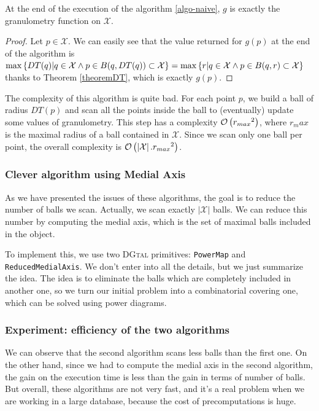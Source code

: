 \begin{theoreme}
	At the end of the execution of the algorithm \ref{algo-naive}, $g$ is exactly the granulometry function on $\mathcal{X}$.
\end{theoreme}

\begin{proof}
Let $p \in \mathcal{X}$. We can easily see that the value returned for $g(p)$ at the end of the algorithm is 
$ \operatorname{max} \left\{ DT(q) | q \in \mathcal{X} \wedge p \in B(q,DT(q)) \subset \mathcal{X} \right\} 
= \operatorname{max} \left\{ r | q \in \mathcal{X} \wedge p \in B(q,r) \subset \mathcal{X} \right\}$ thanks to Theorem \ref{theoremDT}, which is exactly $g(p)$.
\end{proof}

The complexity of this algorithm is quite bad. For each point $p$, we build a ball of radius $DT(p)$ and scan all the points inside the ball to (eventually) update some values of granulometry. This step has a complexity $\mathcal O \left( {r_{max}}^2 \right)$, where $r_max$ is the maximal radius of a ball contained in $\mathcal{X}$. Since we scan only one ball per point, the overall complexity is $\mathcal O \left( \left| \mathcal{X} \right|. {r_{max}}^2 \right)$.

\subsubsection{Clever algorithm using Medial Axis}

As we have presented the issues of these algorithms, the goal is to reduce the number of balls we scan. Actually, we scan exactly $\left| \mathcal{X} \right|$ balls. We can reduce this number by computing the medial axis, which is the set of maximal balls included in the object.

To implement this, we use two \textsc{DGtal} primitives: \texttt{PowerMap} and \texttt{ReducedMedialAxis}. We don't enter into all the details, but we just summarize the idea. The idea is to eliminate the balls which are completely included in another one, so we turn our initial problem into a combinatorial covering one, which can be solved using power diagrams. 

\subsubsection{Experiment: efficiency of the two algorithms}

We can observe that the second algorithm scans less balls than the first one. On the other hand, since we had to compute the medial axis in the second algorithm, the gain on the execution time is less than the gain in terms of number of balls.
But overall, these algorithms are not very fast, and it's a real problem when we are working in a large database, because the cost of precomputations is huge.

